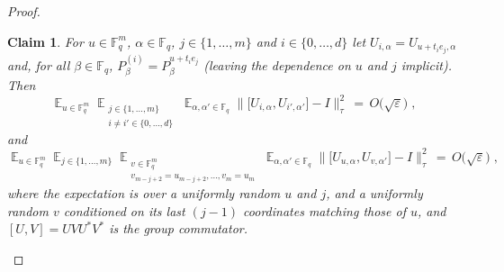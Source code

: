 \documentclass[11pt]{article}
\newtheorem{claim}[theorem]{Claim}
\theoremstyle{definition}
\newcommand{\Id}{\ensuremath{I}}
\DeclareMathOperator*{\Expectation}{\mathbb{E}}
\newcommand{\Es}[1]{\Expectation_{#1}}
\newcommand{\F}{\ensuremath{\mathbb{F}}}
\newcommand{\Z}{\ensuremath{\mathbb{Z}}}
\newcommand{\eps}{\varepsilon}
\begin{document}
\begin{proof}
\begin{claim}\label{claim:z2-stab-2b}
For $u\in \F_q^m$, $\alpha\in\F_q$, $j\in\{1,\ldots,m\}$ and $i\in \{0,\ldots,d\}$ let $U_{i,\alpha} = U_{u+t_ie_j,\alpha}$ and, for all $\beta\in\F_q$, $P^{(i)}_\beta = P^{u+t_ie_j}_\beta$ (leaving the dependence on $u$ and $j$ implicit). Then 
\begin{equation}\label{eq:z2-stab-2b-0a}
\Es{u\in \F_q^m} \Es{\substack{j\in\{1,\ldots,m\}\\i\neq i' \in \{0,\ldots,d\}}}\Es{\alpha,\alpha'\in \F_q} \big\| \big[ U_{i,\alpha}, U_{i',\alpha'}\big]-\Id\big\|_\tau^2\,=\, O\big(\sqrt{\eps}\big)\;, 
\end{equation}
and
\begin{equation}\label{eq:z2-stab-2b-0b}
 \Es{u\in \F_q^m} \Es{j\in\{1,\ldots,m\}} \Es{\substack{v\in \F_q^m \\v_{m-j+2}=u_{m-j+2},\ldots,v_m=u_m}}\Es{\alpha,\alpha'\in \F_q} \big\| \big[ U_{u,\alpha}, U_{v,\alpha'}\big]-\Id\big\|_\tau^2\,=\, O\big(\sqrt{\eps}\big)\;,
\end{equation}
where the expectation is over a uniformly random $u$ and $j$, and a uniformly random $v$ conditioned on its last $(j-1)$ coordinates matching those of $u$, and $[U,V]=UVU^* V^*$ is the group commutator. 
\end{claim}


\end{proof}
\end{document}
